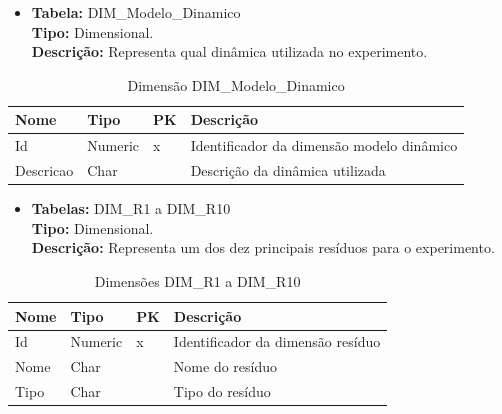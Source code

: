 
\begin{itemize}
	\item
		\textbf{Tabela:} DIM\_Modelo\_Dinamico \\
		\textbf{Tipo:} Dimensional. \\
		\textbf{Descrição:} Representa qual dinâmica utilizada no experimento. \\
\end{itemize}
\begin{table}[!htbp]
	\caption{Dimensão DIM\_Modelo\_Dinamico}
	\centering
	\begin{tabular}{@{}llll@{}}
	\toprule
	\textbf{Nome} 	& \textbf{Tipo} & \textbf{PK} & \textbf{Descrição}           			\\ \midrule
	Id            	& Numeric           & x           & Identificador da dimensão modelo dinâmico   \\
	Descricao     	& Char       &             & Descrição da dinâmica utilizada        \\ \bottomrule
	\end{tabular}
\end{table}


\begin{itemize}
	\item
		\textbf{Tabelas:} DIM\_R1 a DIM\_R10 \\
		\textbf{Tipo:} Dimensional. \\
		\textbf{Descrição:} Representa um dos dez principais resíduos para o experimento. \\
\end{itemize}
\begin{table}[!htbp]
	\caption{Dimensões DIM\_R1 a DIM\_R10}
	\centering
	\begin{tabular}{@{}llll@{}}
	\toprule
	\textbf{Nome} 	& \textbf{Tipo} & \textbf{PK} & \textbf{Descrição}           		\\ \midrule
	Id            	& Numeric           & x           & Identificador da dimensão resíduo   \\
	Nome 		  & Char       &             & Nome do resíduo 					   	\\ 
	Tipo          & Char       &             & Tipo do resíduo           	   		\\ \bottomrule   
	\end{tabular}
\end{table}
	

